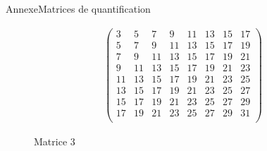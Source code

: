 \begin{frame}{Annexe}{Matrices de quantification}
    \begin{figure}
        \begin{align*}
            \begin{pmatrix}
                3 & 5 & 7 & 9 & 11 & 13 & 15 & 17 \\
                5 & 7 & 9 & 11 & 13 & 15 & 17 & 19 \\
                7 & 9 & 11 & 13 & 15 & 17 & 19 & 21 \\
                9 & 11 & 13 & 15 & 17 & 19 & 21 & 23 \\
                11 & 13 & 15 & 17 & 19 & 21 & 23 & 25 \\
                13 & 15 & 17 & 19 & 21 & 23 & 25 & 27 \\
                15 & 17 & 19 & 21 & 23 & 25 & 27 & 29 \\
                17 & 19 & 21 & 23 & 25 & 27 & 29 & 31 \\ 
            \end{pmatrix}
        \end{align*}    
        \caption{Matrice 3}
    \end{figure}
\end{frame}